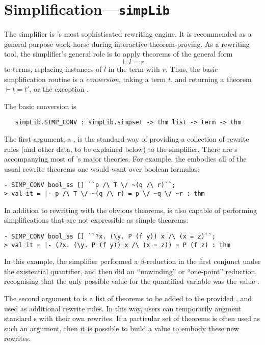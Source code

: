 \section{Simplification---\texttt{simpLib}}
\label{sec:simpLib}

The simplifier is \HOL's most sophisticated rewriting engine.  It is
recommended as a general purpose work-horse during interactive
theorem-proving.  As a rewriting tool, the simplifier's general role
is to apply theorems of the general form
\[
\vdash l = r
\]
to terms, replacing instances of $l$ in the term with $r$. Thus, the
basic simplification routine is a \emph{conversion}, taking a term
$t$, and returning a theorem $\vdash t = t'$, or the exception
.

The basic conversion is
\begin{verbatim}
   simpLib.SIMP_CONV : simpLib.simpset -> thm list -> term -> thm
\end{verbatim}
The first argument, a \simpset, is the standard way of providing a
collection of rewrite rules (and other data, to be explained below) to
the simplifier.  There are \simpset{}s accompanying most of \HOL's
major theories.  For example, the \simpset{} 
embodies all of the usual rewrite theorems one would want over boolean
formulas:
\setcounter{sessioncount}{0}
\begin{session}
\begin{verbatim}
- SIMP_CONV bool_ss [] ``p /\ T \/ ~(q /\ r)``;
> val it = |- p /\ T \/ ~(q /\ r) = p \/ ~q \/ ~r : thm
\end{verbatim}
\end{session}
In addition to rewriting with the obvious theorems,  is
also capable of performing simplifications that are not expressible as
simple theorems:
\begin{session}
\begin{verbatim}
- SIMP_CONV bool_ss [] ``?x. (\y. P (f y)) x /\ (x = z)``;
> val it = |- (?x. (\y. P (f y)) x /\ (x = z)) = P (f z) : thm
\end{verbatim}
\end{session}
In this example, the simplifier performed a $\beta$-reduction in the
first conjunct under the existential quantifier, and then did an
``unwinding'' or ``one-point'' reduction, recognising that the only
possible value for the quantified variable  was the value
.

The second argument to  is a list of theorems to be
added to the provided \simpset, and used as additional rewrite rules.
In this way, users can temporarily augment standard \simpset{}s with
their own rewrites.  If a particular set of theorems is often used as
such an argument, then it is possible to build a \simpset{} value to
embody these new rewrites.

